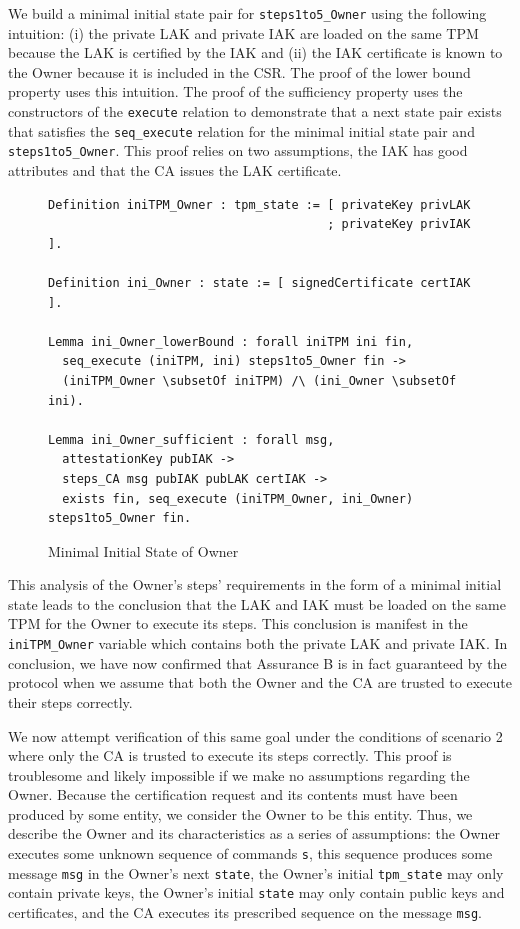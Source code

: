 \documentclass[runningheads]{llncs}
\begin{document}
We build a minimal initial state pair for \verb|steps1to5_Owner| using
the following intuition: (i) the private LAK and private IAK are
loaded on the same TPM because the LAK is certified by the IAK and
(ii) the IAK certificate is known to the Owner because it is included
in the CSR.  The proof of the lower bound property uses this
intuition.  The proof of the sufficiency property uses the
constructors of the \verb|execute| relation to demonstrate that a next
state pair exists that satisfies the \verb|seq_execute| relation for
the minimal initial state pair and \verb|steps1to5_Owner|. This proof
relies on two assumptions, the IAK has good attributes and that the CA
issues the LAK certificate.

\begin{figure}[hbtp]
\begin{lstlisting}[language=Coq]
Definition iniTPM_Owner : tpm_state := [ privateKey privLAK
                                       ; privateKey privIAK ].

Definition ini_Owner : state := [ signedCertificate certIAK ].

Lemma ini_Owner_lowerBound : forall iniTPM ini fin,
  seq_execute (iniTPM, ini) steps1to5_Owner fin ->
  (iniTPM_Owner \subsetOf iniTPM) /\ (ini_Owner \subsetOf ini).

Lemma ini_Owner_sufficient : forall msg,
  attestationKey pubIAK ->
  steps_CA msg pubIAK pubLAK certIAK ->
  exists fin, seq_execute (iniTPM_Owner, ini_Owner) steps1to5_Owner fin.
\end{lstlisting}
\caption{Minimal Initial State of Owner}
\end{figure}

This analysis of the Owner's steps' requirements in the form of a
minimal initial state leads to the conclusion that the LAK and IAK
must be loaded on the same TPM for the Owner to execute its
steps. This conclusion is manifest in the \verb|iniTPM_Owner| variable
which contains both the private LAK and private IAK. In conclusion, we
have now confirmed that Assurance B is in fact guaranteed by the
protocol when we assume that both the Owner and the CA are trusted to
execute their steps correctly.

We now attempt verification of this same goal under the conditions of
scenario 2 where only the CA is trusted to execute its steps
correctly. This proof is troublesome and likely impossible if we make
no assumptions regarding the Owner.  Because the certification request
and its contents must have been produced by some entity, we consider
the Owner to be this entity.  Thus, we describe the Owner and its
characteristics as a series of assumptions: the Owner executes some
unknown sequence of commands \verb|s|, this sequence produces some
message \verb|msg| in the Owner's next \verb|state|, the Owner's
initial \verb|tpm_state| may only contain private keys, the Owner's
initial \verb|state| may only contain public keys and certificates,
and the CA executes its prescribed sequence on the message \verb|msg|.
\end{document}
